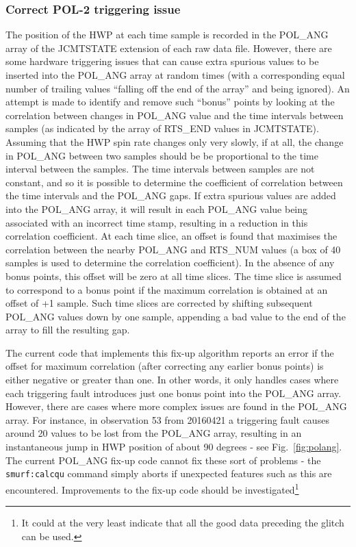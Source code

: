 \documentclass[twoside,11pt]{starlink}
\begin{document}
\subsubsection{Correct POL-2 triggering issue}
\label{sec:triggering}
The position of the HWP at each time sample is recorded in the POL\_ANG
array of the JCMTSTATE extension of each raw data file. However, there
are some hardware triggering issues that can cause extra spurious values to be
inserted into the POL\_ANG array at random times (with a corresponding
equal number of trailing values ``falling off the end of the array'' and
being ignored).  An attempt is made to identify and remove such ``bonus''
points by looking at the correlation between changes in POL\_ANG value
and the time intervals between samples (as indicated by the array of RTS\_END
values in JCMTSTATE). Assuming that the HWP spin rate changes only very
slowly, if at all, the change in POL\_ANG between two samples should be
be proportional to the time interval between the samples. The time
intervals between samples are not constant, and so it is possible to
determine the coefficient of correlation between the time intervals and
the POL\_ANG gaps. If extra spurious values are added into the POL\_ANG
array, it will result in each POL\_ANG value being associated with an
incorrect time stamp, resulting in a reduction in this correlation
coefficient. At each time slice, an offset is found that maximises the
correlation between the nearby POL\_ANG and RTS\_NUM values (a box of
40 samples is used to determine the correlation coefficient). In the
absence of any bonus points, this offset will be zero at all time slices.
The time slice is assumed to correspond to a bonus point if the maximum
correlation is obtained at an offset of +1 sample. Such time slices are
corrected by shifting subsequent POL\_ANG values down by one sample,
appending a bad value to the end of the array to fill the resulting gap.

The current code that implements this fix-up algorithm reports an error
if the offset for maximum correlation (after correcting any earlier bonus
points) is either negative or greater than one. In other words, it only
handles cases where each triggering fault introduces just one bonus point into
the POL\_ANG array. However, there are cases where more complex issues
are found in the POL\_ANG array. For instance, in observation 53 from
20160421 a triggering fault causes around 20 values to be lost from the
POL\_ANG array, resulting in an instantaneous jump in HWP position of about 90
degrees - see Fig.~\ref{fig:polang}. The current POL\_ANG fix-up code
cannot fix these sort of problems - the \texttt{smurf:calcqu} command
simply aborts if unexpected features such as this are encountered.
Improvements to the fix-up code should be investigated\footnote{It could
at the very least indicate that all the good data preceding the glitch
can be used.}
\end{document}
